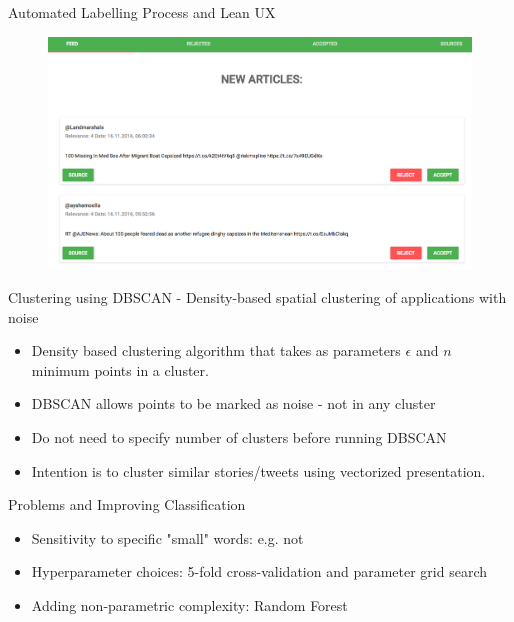 \documentclass{beamer}
\begin{document}
\begin{frame}{Automated Labelling Process and Lean UX}

\begin{figure}[H]
\centering
\includegraphics[scale=0.25]{UI.png}
\label{heat}
\end{figure}

\href{http://migrantnews-web.s3-website-eu-west-1.amazonaws.com/}{}

\end{frame}

\begin{frame}{Clustering using DBSCAN - Density-based spatial clustering of applications with noise}

\begin{itemize}
    \item Density based clustering algorithm that takes as parameters $\epsilon$ and $n$ minimum points in a cluster. 
    \item DBSCAN allows points to be marked as noise - not in any cluster
    \item Do not need to specify number of clusters before running DBSCAN
    \item Intention is to cluster similar stories/tweets using vectorized presentation. 
\end{itemize}

\end{frame}

\begin{frame}{Problems and Improving Classification}

\begin{itemize}
	\item Sensitivity to specific "small" words: e.g. not
\end{itemize}

\begin{itemize}
	\item Hyperparameter choices: 5-fold cross-validation and parameter grid search
	\item Adding non-parametric complexity: Random Forest
\end{itemize}

\end{frame}
\end{document}
